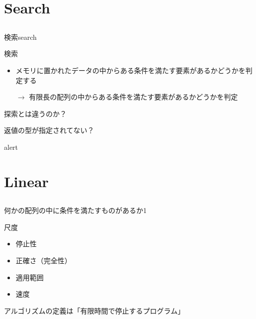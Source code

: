 \documentclass{beamer}
\begin{document}
\section{Search}		%
\subsection{}

\begin{frame}[fragile]{検索}{search}
\begin{block}{検索}
\begin{itemize}%
\item 
メモリに置かれたデータの中からある条件を満たす要素があるかどうかを判定する
\item[$\to$]
有限長の配列の中からある条件を満たす要素があるかどうかを判定
\end{itemize}
\end{block}
探索とは違うのか？

返値の型が指定されてない？
\begin{alertblock}{alert}
\end{alertblock}
\end{frame}

\section{Linear}		%
\subsection{}

\begin{frame}[fragile]{何かの配列の中に条件を満たすものがあるか}{1}
\end{frame}

\begin{frame}[fragile]{尺度}{}
\begin{itemize}%
\item 停止性
\item 正確さ（完全性）
\item 適用範囲
\item 速度
\end{itemize}

\vfill
アルゴリズムの定義は「有限時間で停止するプログラム」
\end{frame}
\end{document}
